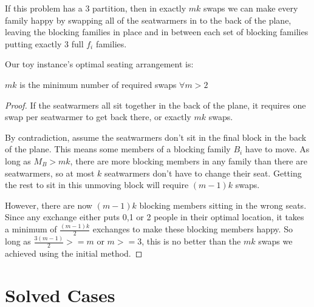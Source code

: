 If this problem has a 3 partition, then in exactly $mk$ swaps we can make every family happy by swapping all of the seatwarmers in to the back of the plane, leaving the blocking families in place and in between each set of blocking families putting exactly 3 full $f_i$ families.  

Our toy instance's optimal seating arrangement is:

\begin{figure}[H]
\centering
{}
\end{figure}

\begin{lem}
$mk$ is the minimum number of required swaps $\forall m > 2$
\end{lem}

\begin{proof}
If the seatwarmers all sit together in the back of the plane, it requires one swap per seatwarmer to get back there, or exactly $mk$ swaps.  

By contradiction, assume the seatwarmers don't sit in the final block in the back of the plane.  This means some members of a blocking family $B_i$ have to move.  As long as $M_B > mk$, there are more blocking members in any family than there are seatwarmers, so at most $k$ seatwarmers don't have to change their seat.  Getting the rest to sit in this unmoving block will require $(m-1)k$ swaps.

However, there are now $(m-1)k$ blocking members sitting in the wrong seats.  Since any exchange either puts 0,1 or 2 people in their optimal location, it takes a minimum of $\frac{(m-1)k}{2}$ exchanges to make these blocking members happy.  So long as $\frac{3(m-1)}{2} >= m$ or $m>=3$, this is no better than the $mk$ swaps we achieved using the initial method.
\end{proof}


\section{Solved Cases}

